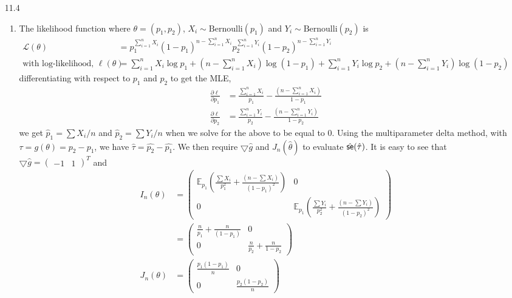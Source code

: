 \documentclass[a4paper,10pt]{article}
\theoremstyle{definition}
\begin{document}
\begin{enumerate}
\item[11.4]
\begin{enumerate}
\item The likelihood function where $\theta = (p_1, p_2)$, $X_i \sim \text{Bernoulli}(p_1)$  and $Y_i \sim \text{Bernoulli}(p_2)$ is 
\begin{align*}
\mathcal{L}(\theta)&=p_1^{\sum_{i=1}^{n} X_i}(1-p_1)^{n - \sum_{i=1}^{n} X_i}p_2^{\sum_{i=1}^{n} Y_i}(1-p_2)^{n-\sum_{i=1}^{n} Y_i}\\
\text{with log-likelihood, } \ell(\theta) &=\sum_{i=1}^{n} X_i \log p_1 + \left(n - \sum_{i=1}^{n} X_i\right) \log (1-p_1) +\sum_{i=1}^{n} Y_i \log p_2 + \left(n - \sum_{i=1}^{n} Y_i\right) \log (1-p_2)
\end{align*}
differentiating with respect to $p_1$ and $p_2$ to get the {\sffamily MLE},
\begin{align*}
\frac{\partial \ell}{\partial p_1} &= \frac{\sum_{i=1}^{n} X_i}{p_1} - \frac{\left(n - \sum_{i=1}^{n} X_i\right)}{1-p_1}\\
\frac{\partial \ell}{\partial p_2} &= \frac{\sum_{i=1}^{n} Y_i}{p_2} - \frac{\left(n - \sum_{i=1}^{n} Y_i\right)}{1-p_2}
\end{align*}
we get $\hat{p}_1 = \sum X_i /n$ and $\hat{p}_2 = \sum Y_i /n$ when we solve for the above to be equal to 0. Using the multiparameter delta method, with $\tau = g(\theta) = p_2-p_1$, we have $\hat{\tau} = \hat{p_2} - \hat{p_1}$. We then require $\bigtriangledown \hat{g}$ and $J_n(\hat{\theta})$ to evaluate $\hat{\text{\sffamily se}}(\hat{\tau})$. It is easy to see that $\bigtriangledown \hat{g} = \begin{pmatrix}-1 & 1\end{pmatrix}^T$ and 
\begin{align*}
I_n(\theta) &= \begin{pmatrix} \mathbb{E}_{p_1}\left(\frac{\sum X_i}{p_1^2}+\frac{\left(n - \sum X_i\right)}{(1-p_1)^2}\right) & 0 \\ 0 & \mathbb{E}_{p_1}\left(\frac{\sum Y_i}{p_2^2}+\frac{\left(n - \sum Y_i\right)}{(1-p_2)^2}\right)\end{pmatrix}\\
&= \begin{pmatrix} \frac{n}{p_1}+\frac{n}{(1-p_1)} & 0 \\ 0 & \frac{n}{p_2}+\frac{n}{1-p_2}\end{pmatrix}\\
J_n(\theta) &= \begin{pmatrix} \frac{p_1(1-p_1)}{n} & 0 \\ 0 & \frac{p_2(1-p_2)}{n}\end{pmatrix}

\end{align*}
\end{enumerate}
\end{enumerate}
\end{document}
